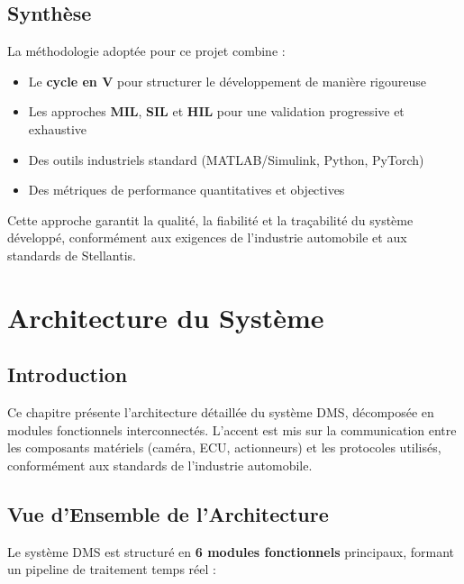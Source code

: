 \documentclass[12pt,a4paper,twoside]{report}
\begin{document}
\section{Synthèse}

La méthodologie adoptée pour ce projet combine :
\begin{itemize}
    \item Le \textbf{cycle en V} pour structurer le développement de manière rigoureuse
    \item Les approches \textbf{MIL}, \textbf{SIL} et \textbf{HIL} pour une validation progressive et exhaustive
    \item Des outils industriels standard (MATLAB/Simulink, Python, PyTorch)
    \item Des métriques de performance quantitatives et objectives
\end{itemize}

Cette approche garantit la qualité, la fiabilité et la traçabilité du système développé, conformément aux exigences de l'industrie automobile et aux standards de Stellantis.


\chapter{Architecture du Système}

\section{Introduction}

Ce chapitre présente l'architecture détaillée du système DMS, décomposée en modules fonctionnels interconnectés. L'accent est mis sur la communication entre les composants matériels (caméra, ECU, actionneurs) et les protocoles utilisés, conformément aux standards de l'industrie automobile.

\section{Vue d'Ensemble de l'Architecture}

Le système DMS est structuré en \textbf{6 modules fonctionnels} principaux, formant un pipeline de traitement temps réel :
\end{document}
